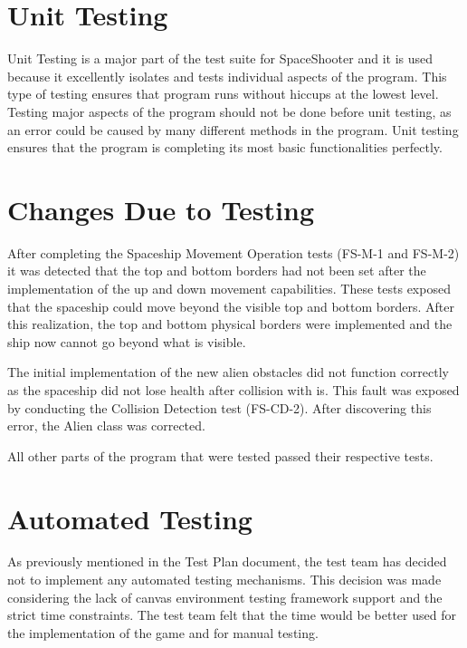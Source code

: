 \documentclass[12pt, titlepage]{article}
\begin{document}
\section{Unit Testing}

Unit Testing is a major part of the test suite for SpaceShooter and it is used because it excellently isolates and tests individual aspects of the program. This type of testing ensures that program runs without hiccups at the lowest level. Testing major aspects of the program should not be done before unit testing, as an error could be caused by many different methods in the program. Unit testing ensures that the program is completing its most basic functionalities perfectly. 

\section{Changes Due to Testing}

\noindent After completing the Spaceship Movement Operation tests (FS-M-1 and FS-M-2) it was detected that the top and bottom borders had not been set after the implementation of the up and down movement capabilities. These tests exposed that the spaceship could move beyond the visible top and bottom borders. After this realization, the top and bottom physical borders were implemented and the ship now cannot go beyond what is visible. 
\newline

\noindent The initial implementation of the new alien obstacles did not function correctly as the spaceship did not lose health after collision with is. This fault was exposed by conducting the Collision Detection test (FS-CD-2). After discovering this error, the Alien class was corrected.
\newline

\noindent All other parts of the program that were tested passed their respective tests. 

\section{Automated Testing}

As previously mentioned in the Test Plan document, the test team has decided not to implement any automated testing mechanisms. This decision was made considering the lack of canvas environment testing framework support and the strict time constraints. The test team felt that the time would be better used for the implementation of the game and for manual testing.
\end{document}
